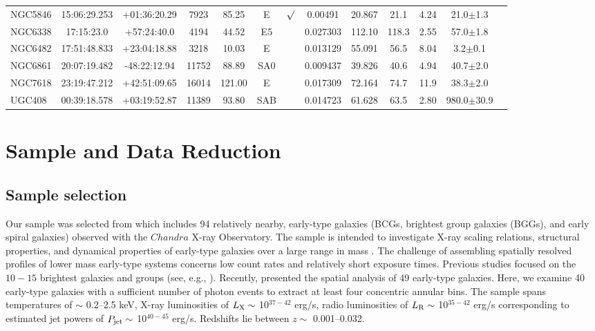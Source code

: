 \documentclass[iop]{emulateapj}
\begin{document}
\begin{table}
\begin{tabular}{lcccccccccccc}
NGC5846 & 15:06:29.253 & +01:36:20.29 &  7923 & 85.25    & E    & $\surd$  & 0.00491  & 20.867 & 21.1  &  4.24 & 21.0$\pm$1.3 \\
NGC6338 & 17:15:23.0 & +57:24:40.0 & 4194 & 44.52 & E5 &           & 0.027303 & 112.10 & 118.3 & 2.55 & 57.0$\pm$1.8 \\
NGC6482 & 17:51:48.833 & +23:04:18.88 & 3218 & 10.03 & E &            & 0.013129 & 55.091 & 56.5 & 8.04 & 3.2$\pm$0.1 \\
NGC6861 & 20:07:19.482 & -48:22:12.94 & 11752 & 88.89 & SA0 &        & 0.009437 & 39.826 & 40.6 & 4.94 & 40.7$\pm$2.0 \\
NGC7618 & 23:19:47.212 & +42:51:09.65 & 16014 & 121.00   & E &         & 0.017309 & 72.164 & 74.7  &  11.9 & 38.3$\pm$2.0 \\
UGC408  & 00:39:18.578 & +03:19:52.87 & 11389 & 93.80 & SAB & & 0.014723 & 61.628 & 63.5 & 2.80 & 980.0$\pm$30.9 \\
\hline
\end{tabular}
\end{table}

\section{Sample and Data Reduction}\label{sec:2}
\subsection{Sample selection}

Our sample was selected from \citet{Babyk:17scal}  which includes 94 relatively nearby, early-type galaxies (BCGs, brightest group galaxies (BGGs), and early spiral galaxies) observed with the $Chandra$ X-ray Observatory.  The sample is intended to investigate X-ray scaling relations, structural properties, and dynamical properties of early-type galaxies over a large range in mass \citep{Main:17, Hogan:17, Hogan:17a, Pulido:17}. The challenge of assembling spatially resolved profiles of lower mass early-type systems concerns low count rates and relatively short exposure times. Previous studies focused on the $10-15$ brightest galaxies and groups (see, e.g., \citet{Werner:13}).  Recently, \citet{Werner:18new} presented the spatial analysis of 49 early-type galaxies. Here, we examine 40 early-type galaxies with a sufficient number of photon events to extract at least four concentric annular bins. The sample spans temperatures of $\sim$ 0.2--2.5 keV, X-ray luminosities of $L_{\rm X} \sim $ 10$^{37-42}$ erg/s, radio luminosities of $L_{\rm R} \sim$ 10$^{35-42}$ erg/s  corresponding to estimated jet powers of $P_{\rm jet} \sim$ 10$^{40-45}$ erg/s. Redshifts lie between $z \sim$ 0.001--0.032.
\end{document}
